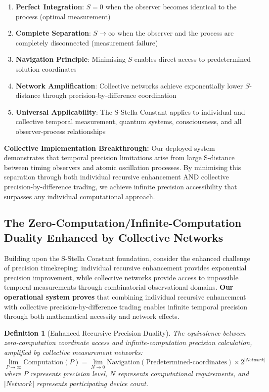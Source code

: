 \documentclass[12pt,a4paper]{article}
\newtheorem{definition}[theorem]{Definition}
\begin{document}
\begin{enumerate}
\item \textbf{Perfect Integration}: $S = 0$ when the observer becomes identical to the process (optimal measurement)
\item \textbf{Complete Separation}: $S \to \infty$ when the observer and the process are completely disconnected (measurement failure)
\item \textbf{Navigation Principle}: Minimising $S$ enables direct access to predetermined solution coordinates
\item \textbf{Network Amplification}: Collective networks achieve exponentially lower $S$-distance through precision-by-difference coordination
\item \textbf{Universal Applicability}: The S-Stella Constant applies to individual and collective temporal measurement, quantum systems, consciousness, and all observer-process relationships
\end{enumerate}

\textbf{Collective Implementation Breakthrough:} Our deployed system demonstrates that temporal precision limitations arise from large S-distance between timing observers and atomic oscillation processes. By minimising this separation through both individual recursive enhancement AND collective precision-by-difference trading, we achieve infinite precision accessibility that surpasses any individual computational approach.

\subsection{The Zero-Computation/Infinite-Computation Duality Enhanced by Collective Networks}

Building upon the S-Stella Constant foundation, consider the enhanced challenge of precision timekeeping: individual recursive enhancement provides exponential precision improvement, while collective networks provide access to impossible temporal measurements through combinatorial observational domains. \textbf{Our operational system proves} that combining individual recursive enhancement with collective precision-by-difference trading enables infinite temporal precision through both mathematical necessity and network effects.

\begin{definition}[Enhanced Recursive Precision Duality]
The equivalence between zero-computation coordinate access and infinite-computation precision calculation, amplified by collective measurement networks:
$$\lim_{P \to \infty} \text{Computation}(P) = \lim_{N \to 0} \text{Navigation}(\text{Predetermined-coordinates}) \times 2^{|Network|}$$
where $P$ represents precision level, $N$ represents computational requirements, and $|Network|$ represents participating device count.
\end{definition}
\end{document}

